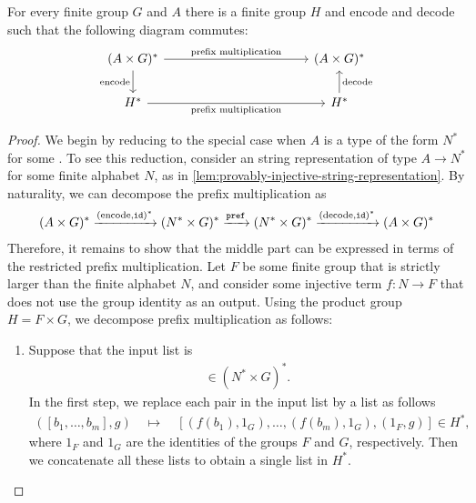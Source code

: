 \begin{lemma}\label{lem:reduction-to-non-extended-prefix-multiplication}
    For every finite group $G$ and  $A$ there is a finite group $H$ and   encode and decode such that the following diagram commutes:
    \[
    \begin{tikzcd}[column sep=2cm]
    (A \times G)^* 
    \ar[rr, "\text{prefix multiplication}"]
    \ar[d, "\text{encode}"']
    &  & (A \times G)^* \\
    H^*
    \ar[rr,"\text{prefix multiplication}"'] &  &
    H^*
    \ar[u, "\text{decode}"']
    \end{tikzcd}
    \]
\end{lemma}
\begin{proof}
    We begin by reducing  to  the special case when $A$ is a type of the form $N^*$ for some . To see this reduction, consider an  string representation of type $A \to N^*$ for some finite alphabet $N$, as in \cref{lem:provably-injective-string-representation}. By naturality, we can decompose the prefix multiplication as 
    \begin{align*}
    (A \times G)^* \xrightarrow{(\text{encode}, \mathtt{id})^*}
        (N^* \times G)^* \xrightarrow{\mathtt{pref}}
    (N^* \times G)^* \xrightarrow{(\text{decode}, \mathtt{id})^*}
(A \times G)^*
    \end{align*}
    Therefore, it remains to show that the middle part can be expressed in terms of the restricted prefix multiplication. 
Let $F$ be some finite group that is strictly larger than the finite alphabet $N$, and consider some injective term $f : N \to F$ that does not use the group identity as an output. Using the product group $H = F \times G$, we decompose  prefix multiplication as follows: 
    \begin{enumerate}
        \item Suppose that the input list is 
        \begin{align*}
        [(w_1,g_1),\ldots,(w_n,g_n)] \in (N^* \times G)^*.
        \end{align*}
        In the first step, we replace each pair in the input list by a list as follows
        \begin{align*}
        ([b_1,\ldots,b_m],g) \quad \mapsto \quad [(f(b_1),1_G),\ldots,(f(b_m),1_G),(1_F,g)] \in H^*,
        \end{align*}
        where $1_F$ and $1_G$ are the identities of the groups $F$ and $G$, respectively. Then we concatenate all these lists to obtain a single list in $H^*$. 

\end{enumerate}
\end{proof}
